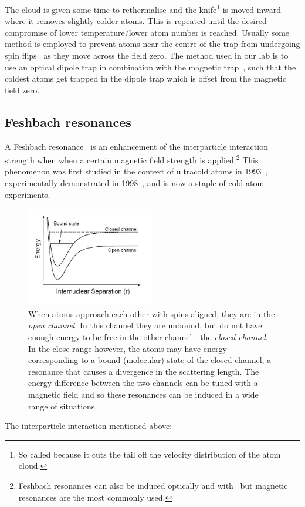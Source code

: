 The cloud is given some time to rethermalise and the knife\footnote{So called because it cuts the tail off the velocity distribution of the atom cloud.} is moved inward where it removes slightly colder atoms. This is repeated until the desired compromise of lower temperature/lower atom number is reached. Usually some method is employed to prevent atoms near the centre of the trap from undergoing spin flips~\cite{brink_majorana_2006} as they move across the field zero. The method used in our lab is to use an optical dipole trap in combination with the magnetic trap~\cite{lin_rapid_2009}, such that the coldest atoms get trapped in the dipole trap which is offset from the magnetic field zero.

\subsection{Feshbach resonances}\label{sec:feshbach}

A Feshbach resonance~\cite{chin_feshbach_2010} is an enhancement of the interparticle interaction strength when when a certain magnetic field strength is applied.\footnote{Feshbach resonances can also be induced optically and with \rf\, but magnetic resonances are the most commonly used.} This phenomenon was first studied in the context of ultracold atoms in 1993~\cite{tiesinga_threshold_1993}, experimentally demonstrated in 1998~\cite{inouye_observation_1998}, and is now a staple of cold atom experiments.

\begin{figure}%
\begin{center}
\includegraphics[width=0.5\textwidth]{figures/unsorted/feshbach.png}
\caption{When atoms approach each other with spins aligned, they are in the \emph{open channel}. In this channel they are unbound, but do not have enough energy to be free in the other channel---the \emph{closed channel}. In the close range however, the atoms may have energy corresponding to a bound (molecular) state of the closed channel, a resonance that causes a divergence in the scattering length. The energy difference between the two channels can be tuned with a magnetic field and so these resonances can be induced in a wide range of situations.}\label{fig:feshbach}
\end{center}
\end{figure}
The interparticle interaction mentioned above:

